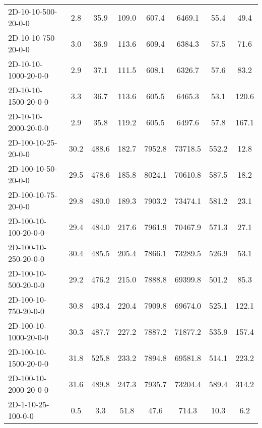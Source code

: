 \documentclass{article}
\begin{document}
\begin{table}[h]
\begin{center}
\begin{tabular}{|l||c|c|c|c|c|c|c|}
            2D-10-10-500-20-0-0            & 2.8  & 35.9      & 109.0      & 607.4       & 6469.1   & 55.4      & 49.4       \\
            2D-10-10-750-20-0-0            & 3.0  & 36.9      & 113.6      & 609.4       & 6384.3   & 57.5      & 71.6       \\
            2D-10-10-1000-20-0-0           & 2.9  & 37.1      & 111.5      & 608.1       & 6326.7   & 57.6      & 83.2       \\
            2D-10-10-1500-20-0-0           & 3.3  & 36.7      & 113.6      & 605.5       & 6465.3   & 53.1      & 120.6      \\
            2D-10-10-2000-20-0-0           & 2.9  & 35.8      & 119.2      & 605.5       & 6497.6   & 57.8      & 167.1      \\
            \hline
            2D-100-10-25-20-0-0            & 30.2 & 488.6     & 182.7      & 7952.8      & 73718.5  & 552.2     & 12.8       \\
            2D-100-10-50-20-0-0            & 29.5 & 478.6     & 185.8      & 8024.1      & 70610.8  & 587.5     & 18.2       \\
            2D-100-10-75-20-0-0            & 29.8 & 480.0     & 189.3      & 7903.2      & 73474.1  & 581.2     & 23.1       \\
            2D-100-10-100-20-0-0           & 29.4 & 484.0     & 217.6      & 7961.9      & 70467.9  & 571.3     & 27.1       \\
            2D-100-10-250-20-0-0           & 30.4 & 485.5     & 205.4      & 7866.1      & 73289.5  & 526.9     & 53.1       \\
            2D-100-10-500-20-0-0           & 29.2 & 476.2     & 215.0      & 7888.8      & 69399.8  & 501.2     & 85.3       \\
            2D-100-10-750-20-0-0           & 30.8 & 493.4     & 220.4      & 7909.8      & 69674.0  & 525.1     & 122.1      \\
            2D-100-10-1000-20-0-0          & 30.3 & 487.7     & 227.2      & 7887.2      & 71877.2  & 535.9     & 157.4      \\
            2D-100-10-1500-20-0-0          & 31.8 & 525.8     & 233.2      & 7894.8      & 69581.8  & 514.1     & 223.2      \\
            2D-100-10-2000-20-0-0          & 31.6 & 489.8     & 247.3      & 7935.7      & 73204.4  & 589.4     & 314.2      \\
            \hline
            2D-1-10-25-100-0-0             & 0.5  & 3.3       & 51.8       & 47.6        & 714.3    & 10.3      & 6.2        \\

\end{tabular}
\end{center}
\end{table}
\end{document}
